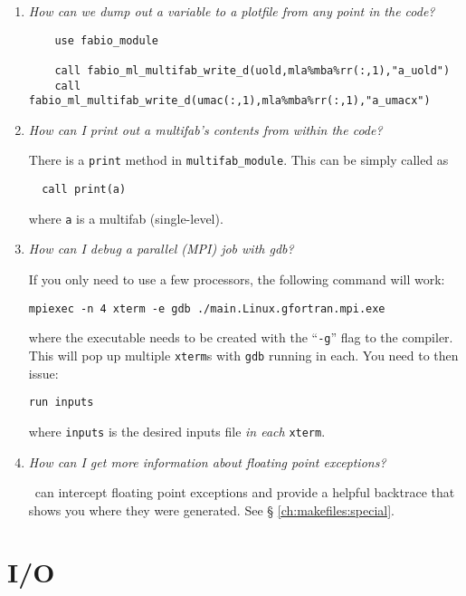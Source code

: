 \begin{enumerate}

\item {\em How can we dump out a variable to a plotfile from any point in the
   code?} 
%
\begin{verbatim}
    use fabio_module

    call fabio_ml_multifab_write_d(uold,mla%mba%rr(:,1),"a_uold")
    call fabio_ml_multifab_write_d(umac(:,1),mla%mba%rr(:,1),"a_umacx")
\end{verbatim}

\item {\em How can I print out a multifab's contents from within the code?}

  There is a {\tt print} method in {\tt multifab\_module}.  This can
  be simply called as
  \begin{verbatim}
  call print(a)
  \end{verbatim}
  where {\tt a} is a multifab (single-level).

\item {\em How can I debug a parallel (MPI) job with gdb?}

If you only need to use a few processors, the following command will work:
\begin{verbatim}
mpiexec -n 4 xterm -e gdb ./main.Linux.gfortran.mpi.exe 
\end{verbatim}
where the executable needs to be created with the ``{\tt -g}'' flag to
the compiler.  This will pop up multiple {\tt xterm}s with {\tt gdb} running
in each.  You need to then issue:
\begin{verbatim}
run inputs
\end{verbatim}
where {\tt inputs} is the desired inputs file {\em in each} {\tt xterm}.



\item {\em How can I get more information about floating point exceptions?}

\fboxlib\ can intercept floating point exceptions and provide a helpful
backtrace that shows you where they were generated.  See \S
\ref{ch:makefiles:special}.


\end{enumerate}


\section{I/O}

